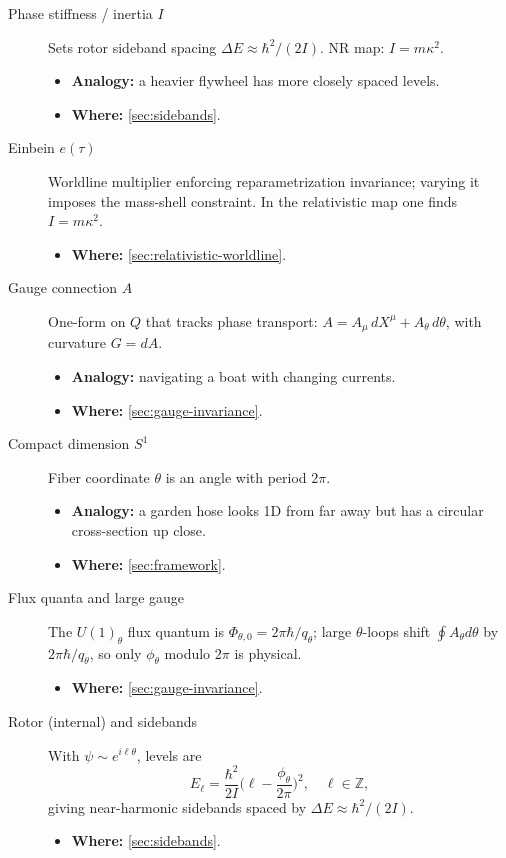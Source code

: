 \begin{description}
  \item[Phase stiffness / inertia $I$] Sets rotor sideband spacing $\Delta E\approx \hbar^2/(2I)$. NR map: $I=m\kappa^2$.
  \begin{itemize}
    \item \textbf{Analogy:} a heavier flywheel has more closely spaced levels.
    \item \textbf{Where:} \cref{sec:sidebands}.
  \end{itemize}

  \item[Einbein $e(\tau)$] Worldline multiplier enforcing reparametrization invariance; varying it imposes the mass-shell constraint. In the relativistic map one finds $I=m\kappa^2$.
  \begin{itemize}
    \item \textbf{Where:} \cref{sec:relativistic-worldline}.
  \end{itemize}

  \item[Gauge connection $A$] One-form on $Q$ that tracks phase transport:
  $A= A_\mu\,dX^\mu + A_\theta\,d\theta$, with curvature $G=dA$.
  \begin{itemize}
    \item \textbf{Analogy:} navigating a boat with changing currents.
    \item \textbf{Where:} \cref{sec:gauge-invariance}.
  \end{itemize}

  \item[Compact dimension $S^1$] Fiber coordinate $\theta$ is an angle with period $2\pi$.
  \begin{itemize}
    \item \textbf{Analogy:} a garden hose looks 1D from far away but has a circular cross-section up close.
    \item \textbf{Where:} \cref{sec:framework}.
  \end{itemize}

  \item[Flux quanta and large gauge] The $U(1)_\theta$ flux quantum is $\Phi_{\theta,0}=2\pi\hbar/q_\theta$; large $\theta$-loops shift $\oint A_\theta d\theta$ by $2\pi\hbar/q_\theta$, so only $\phi_\theta$ modulo $2\pi$ is physical.
  \begin{itemize}
    \item \textbf{Where:} \cref{sec:gauge-invariance}.
  \end{itemize}

  \item[Rotor (internal) and sidebands] With $\psi\sim e^{i\ell\theta}$, levels are
  \[
    E_\ell=\frac{\hbar^2}{2I}\Big(\ell-\frac{\phi_\theta}{2\pi}\Big)^2,\quad \ell\in\mathbb Z,
  \]
  giving near-harmonic sidebands spaced by $\Delta E\approx \hbar^2/(2I)$.
  \begin{itemize}
    \item \textbf{Where:} \cref{sec:sidebands}.
  \end{itemize}


\end{description}
